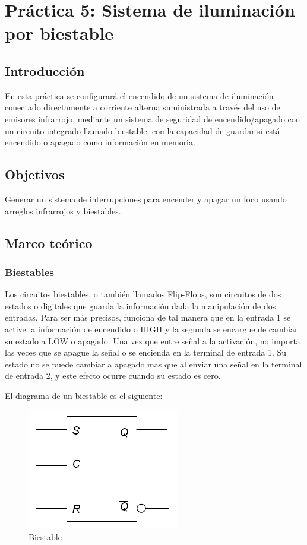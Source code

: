 \clearpage

\section{Práctica 5: Sistema de iluminación por biestable}

\subsection{Introducción}
En esta práctica se configurará el encendido de un sistema de iluminación conectado directamente a corriente alterna suministrada
a través del uso de emisores infrarrojo, mediante un sistema de seguridad de encendido/apagado con un circuito integrado
llamado biestable, con la capacidad de guardar si está encendido o apagado como información en memoria.

\subsection{Objetivos}
Generar un sistema de interrupciones para encender y apagar un foco usando arreglos infrarrojos y biestables.


\subsection{Marco teórico}
\subsubsection{Biestables}
Los circuitos biestables, o también llamados Flip-Flops, son circuitos de dos estados o digitales que guarda la información
dada la manipulación de dos entradas. Para ser más precisos, funciona de tal manera que en la entrada 1 se active la información
de encendido o HIGH y la segunda se encargue de cambiar su estado a LOW o apagado. Una vez que entre señal a la activación, no
importa las veces que se apague la señal o se encienda en la terminal de entrada 1. Su estado no se puede cambiar a apagado mas
que al enviar una señal en la terminal de entrada 2, y este efecto ocurre cuando su estado es cero. 
\parencite{markovic2001analysis}

El diagrama de un biestable es el siguiente:

\begin{figure}
    \centering
    \includegraphics[scale=0.5]{media/Biestable.jpg}
    \caption{Biestable}
    \label{Fig: Circuito biestable}
\end{figure}

